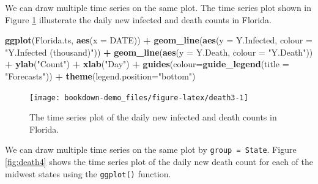\documentclass[]{book}
\newenvironment{Shaded}{\begin{snugshade}}{\end{snugshade}}
\newcommand{\KeywordTok}[1]{\textcolor[rgb]{0.13,0.29,0.53}{\textbf{#1}}}
\newcommand{\DataTypeTok}[1]{\textcolor[rgb]{0.13,0.29,0.53}{#1}}
\newcommand{\StringTok}[1]{\textcolor[rgb]{0.31,0.60,0.02}{#1}}
\newcommand{\OperatorTok}[1]{\textcolor[rgb]{0.81,0.36,0.00}{\textbf{#1}}}
\newcommand{\NormalTok}[1]{#1}
\begin{document}
We can draw multiple time series on the same plot. The time series plot
shown in Figure \ref{fig:death3} illusterate the daily new infected and
death counts in Florida.

\begin{Shaded}
\begin{Highlighting}[]
  \KeywordTok{ggplot}\NormalTok{(Florida.ts, }\KeywordTok{aes}\NormalTok{(}\DataTypeTok{x =}\NormalTok{ DATE)) }\OperatorTok{+}
\StringTok{  }\KeywordTok{geom_line}\NormalTok{(}\KeywordTok{aes}\NormalTok{(}\DataTypeTok{y =}\NormalTok{ Y.Infected, }\DataTypeTok{colour =} \StringTok{"Y.Infected (thousand)"}\NormalTok{)) }\OperatorTok{+}
\StringTok{  }\KeywordTok{geom_line}\NormalTok{(}\KeywordTok{aes}\NormalTok{(}\DataTypeTok{y =}\NormalTok{ Y.Death, }\DataTypeTok{colour =} \StringTok{"Y.Death"}\NormalTok{)) }\OperatorTok{+}
\StringTok{  }\KeywordTok{ylab}\NormalTok{(}\StringTok{"Count"}\NormalTok{) }\OperatorTok{+}\StringTok{ }\KeywordTok{xlab}\NormalTok{(}\StringTok{"Day"}\NormalTok{) }\OperatorTok{+}
\StringTok{  }\KeywordTok{guides}\NormalTok{(}\DataTypeTok{colour=}\KeywordTok{guide_legend}\NormalTok{(}\DataTypeTok{title =} \StringTok{"Forecasts"}\NormalTok{)) }\OperatorTok{+}
\StringTok{  }\KeywordTok{theme}\NormalTok{(}\DataTypeTok{legend.position=}\StringTok{"bottom"}\NormalTok{)}
\end{Highlighting}
\end{Shaded}

\begin{figure}

{\centering \texttt{[image: bookdown-demo\_files/figure-latex/death3-1]} 

}

\caption{The time series plot of the daily new infected and death counts in Florida.}\label{fig:death3}
\end{figure}

We can draw multiple time series on the same plot by
\texttt{group\ =\ State}. Figure \ref{fig:death4} shows the time series
plot of the daily new death count for each of the midwest states using
the \texttt{ggplot()} function.

\begin{Shaded}
\end{Shaded}
\end{document}
